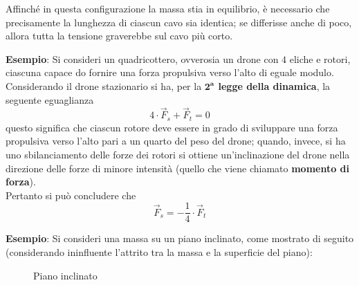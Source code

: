 \documentclass[a4paper]{extarticle}
\begin{document}
\vspace{1em}
\noindent
Affinché in questa configurazione la massa stia in equilibrio, è necessario che precisamente la lunghezza di ciascun cavo sia identica; se differisse anche di poco, allora tutta la tensione graverebbe sul cavo più corto.

\vspace{2em}
\noindent
\textbf{Esempio}: Si consideri un quadricottero, ovverosia un drone con $4$ eliche e rotori, ciascuna capace do fornire una forza propulsiva verso l'alto di eguale modulo.\\
Considerando il drone stazionario si ha, per la \textbf{$\boldsymbol{2^a}$ legge della dinamica}, la seguente eguaglianza
\[4 \cdot \vec{F}_{s} + \vec{F}_t = 0\]
questo significa che ciascun rotore deve essere in grado di sviluppare una forza propulsiva verso l'alto pari a un quarto del peso del drone; quando, invece, si ha uno sbilanciamento delle forze dei rotori si ottiene un'inclinazione del drone nella direzione delle forze di minore intensità (quello che viene chiamato \textbf{momento di forza}).\\
Pertanto si può concludere che
\[\vec{F}_{s} = - \frac{1}{4} \cdot \vec{F}_t\]

\newpage
\noindent
\textbf{Esempio}: Si consideri una massa su un piano inclinato, come mostrato di seguito (considerando ininfluente l'attrito tra la massa e la superficie del piano):

\vspace{1em}
\noindent
\begin{figure}[H]
  \centering
  \newcommand{\ang}{30}

  \caption{Piano inclinato}
  \label{fig:piano_inclinato}
\end{figure}
\end{document}
